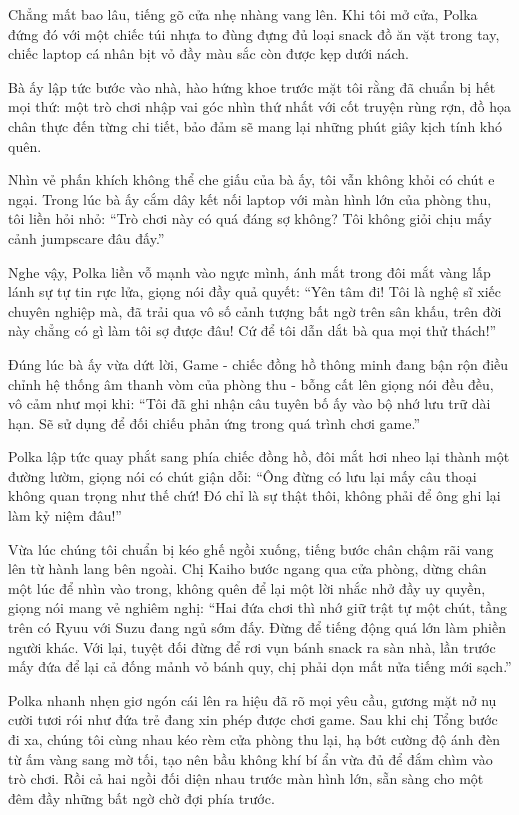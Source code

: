 \documentclass[../main.tex]{subfiles}
\begin{document}
Chẳng mất bao lâu, tiếng gõ cửa nhẹ nhàng vang lên. Khi tôi mở cửa, Polka đứng đó với một chiếc túi nhựa to đùng đựng đủ loại snack đồ ăn vặt trong tay, chiếc laptop cá nhân bịt vỏ đầy màu sắc còn được kẹp dưới nách.

Bà ấy lập tức bước vào nhà, hào hứng khoe trước mặt tôi rằng đã chuẩn bị hết mọi thứ: một trò chơi nhập vai góc nhìn thứ nhất với cốt truyện rùng rợn, đồ họa chân thực đến từng chi tiết, bảo đảm sẽ mang lại những phút giây kịch tính khó quên.

Nhìn vẻ phấn khích không thể che giấu của bà ấy, tôi vẫn không khỏi có chút e ngại. Trong lúc bà ấy cắm dây kết nối laptop với màn hình lớn của phòng thu, tôi liền hỏi nhỏ: ``Trò chơi này có quá đáng sợ không? Tôi không giỏi chịu mấy cảnh jumpscare đâu đấy.''

Nghe vậy, Polka liền vỗ mạnh vào ngực mình, ánh mắt trong đôi mắt vàng lấp lánh sự tự tin rực lửa, giọng nói đầy quả quyết: ``Yên tâm đi! Tôi là nghệ sĩ xiếc chuyên nghiệp mà, đã trải qua vô số cảnh tượng bất ngờ trên sân khấu, trên đời này chẳng có gì làm tôi sợ được đâu! Cứ để tôi dẫn dắt bà qua mọi thử thách!''

Đúng lúc bà ấy vừa dứt lời, Game - chiếc đồng hồ thông minh đang bận rộn điều chỉnh hệ thống âm thanh vòm của phòng thu - bỗng cất lên giọng nói đều đều, vô cảm như mọi khi: ``Tôi đã ghi nhận câu tuyên bố ấy vào bộ nhớ lưu trữ dài hạn. Sẽ sử dụng để đối chiếu phản ứng trong quá trình chơi game.''

Polka lập tức quay phắt sang phía chiếc đồng hồ, đôi mắt hơi nheo lại thành một đường lườm, giọng nói có chút giận dỗi: ``Ông đừng có lưu lại mấy câu thoại không quan trọng như thế chứ! Đó chỉ là sự thật thôi, không phải để ông ghi lại làm kỷ niệm đâu!''

Vừa lúc chúng tôi chuẩn bị kéo ghế ngồi xuống, tiếng bước chân chậm rãi vang lên từ hành lang bên ngoài. Chị Kaiho bước ngang qua cửa phòng, dừng chân một lúc để nhìn vào trong, không quên để lại một lời nhắc nhở đầy uy quyền, giọng nói mang vẻ nghiêm nghị: ``Hai đứa chơi thì nhớ giữ trật tự một chút, tầng trên có Ryuu với Suzu đang ngủ sớm đấy. Đừng để tiếng động quá lớn làm phiền người khác. Với lại, tuyệt đối đừng để rơi vụn bánh snack ra sàn nhà, lần trước mấy đứa để lại cả đống mảnh vỏ bánh quy, chị phải dọn mất nửa tiếng mới sạch.''

Polka nhanh nhẹn giơ ngón cái lên ra hiệu đã rõ mọi yêu cầu, gương mặt nở nụ cười tươi rói như đứa trẻ đang xin phép được chơi game. Sau khi chị Tổng bước đi xa, chúng tôi cùng nhau kéo rèm cửa phòng thu lại, hạ bớt cường độ ánh đèn từ ấm vàng sang mờ tối, tạo nên bầu không khí bí ẩn vừa đủ để đắm chìm vào trò chơi. Rồi cả hai ngồi đối diện nhau trước màn hình lớn, sẵn sàng cho một đêm đầy những bất ngờ chờ đợi phía trước.
\end{document}
